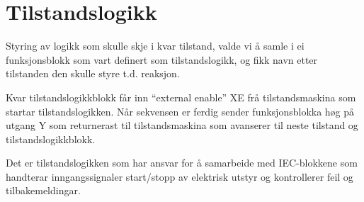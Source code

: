 \newpage
\section{Tilstandslogikk}
\thispagestyle{fancy}

Styring av logikk som skulle skje i kvar tilstand, valde vi å samle i ei funksjonsblokk som vart definert som tilstandslogikk, og fikk navn etter tilstanden
den skulle styre t.d. reaksjon.

Kvar tilstandslogikkblokk får inn ``external enable'' XE frå tilstandsmaskina som startar tilstandslogikken. Når sekvensen er ferdig sender
funksjonsblokka høg på utgang Y som returnerast til tilstandsmaskina som avanserer til neste tilstand og tilstandslogikkblokk.

Det er tilstandslogikken som har ansvar for å samarbeide med \gls{IEC}-blokkene som handterar inngangssignaler
start/stopp av elektrisk utstyr og kontrollerer feil og tilbakemeldingar. \newline \newline \newline

